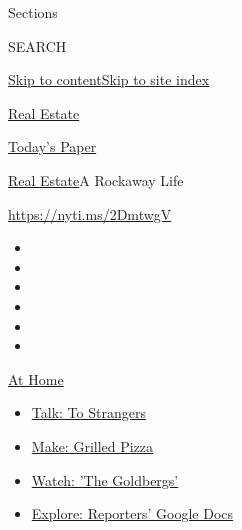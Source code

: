 Sections

SEARCH

\protect\hyperlink{site-content}{Skip to
content}\protect\hyperlink{site-index}{Skip to site index}

\href{https://www.nytimes3xbfgragh.onion/section/realestate}{Real
Estate}

\href{https://myaccount.nytimes3xbfgragh.onion/auth/login?response_type=cookie\&client_id=vi}{}

\href{https://www.nytimes3xbfgragh.onion/section/todayspaper}{Today's
Paper}

\href{/section/realestate}{Real Estate}\textbar{}A Rockaway Life

\url{https://nyti.ms/2DmtwgV}

\begin{itemize}
\item
\item
\item
\item
\item
\item
\end{itemize}

\href{https://www.nytimes3xbfgragh.onion/spotlight/at-home?action=click\&pgtype=Article\&state=default\&region=TOP_BANNER\&context=at_home_menu}{At
Home}

\begin{itemize}
\tightlist
\item
  \href{https://www.nytimes3xbfgragh.onion/2020/08/03/well/family/the-benefits-of-talking-to-strangers.html?action=click\&pgtype=Article\&state=default\&region=TOP_BANNER\&context=at_home_menu}{Talk:
  To Strangers}
\item
  \href{https://www.nytimes3xbfgragh.onion/2020/08/01/at-home/coronavirus-make-pizza-on-a-grill.html?action=click\&pgtype=Article\&state=default\&region=TOP_BANNER\&context=at_home_menu}{Make:
  Grilled Pizza}
\item
  \href{https://www.nytimes3xbfgragh.onion/2020/07/31/arts/television/goldbergs-abc-stream.html?action=click\&pgtype=Article\&state=default\&region=TOP_BANNER\&context=at_home_menu}{Watch:
  'The Goldbergs'}
\item
  \href{https://www.nytimes3xbfgragh.onion/interactive/2020/at-home/even-more-reporters-editors-diaries-lists-recommendations.html?action=click\&pgtype=Article\&state=default\&region=TOP_BANNER\&context=at_home_menu}{Explore:
  Reporters' Google Docs}
\end{itemize}

